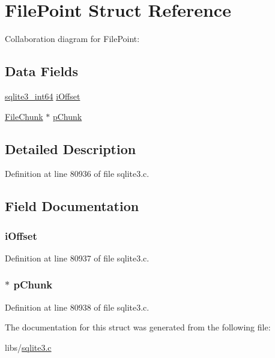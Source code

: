 \hypertarget{struct_file_point}{}\section{File\+Point Struct Reference}
\label{struct_file_point}


Collaboration diagram for File\+Point\+:
\subsection*{Data Fields}
\begin{DoxyCompactItemize}
\item 
\hyperlink{sqlite3_8c_a0a4d3e6c1ad46f90e746b920ab6ca0d2}{sqlite3\+\_\+int64} \hyperlink{struct_file_point_adc5eed1be8af43d65a10bfc44e0994b7}{i\+Offset}
\item 
\hyperlink{struct_file_chunk}{File\+Chunk} $\ast$ \hyperlink{struct_file_point_a46486e54fdc42c8d5205cba61e5012e5}{p\+Chunk}
\end{DoxyCompactItemize}


\subsection{Detailed Description}


Definition at line 80936 of file sqlite3.\+c.



\subsection{Field Documentation}
\hypertarget{struct_file_point_adc5eed1be8af43d65a10bfc44e0994b7}{}
\subsubsection[{i\+Offset}]{ i\+Offset}\label{struct_file_point_adc5eed1be8af43d65a10bfc44e0994b7}


Definition at line 80937 of file sqlite3.\+c.

\hypertarget{struct_file_point_a46486e54fdc42c8d5205cba61e5012e5}{}
\subsubsection[{p\+Chunk}]{$\ast$ p\+Chunk}\label{struct_file_point_a46486e54fdc42c8d5205cba61e5012e5}


Definition at line 80938 of file sqlite3.\+c.



The documentation for this struct was generated from the following file\+:\begin{DoxyCompactItemize}
\item 
libs/\hyperlink{sqlite3_8c}{sqlite3.\+c}\end{DoxyCompactItemize}
